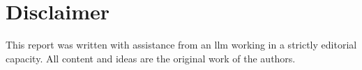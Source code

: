 \section{Disclaimer}
\label{sec:disclaimer}

This report was written with assistance from an llm working in a strictly editorial capacity. All content and ideas are the original work of the authors.